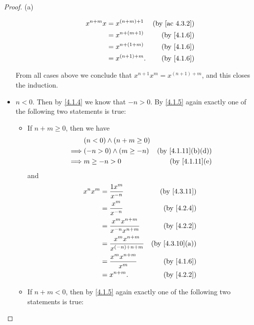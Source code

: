 \begin{proof}{(a)}
\begin{itemize}
\begin{itemize}
\begin{align*}
                    x^{n + m} x & = x^{(n + m) + 1}  & \text{(by \cref{ac 4.3.2})} \\
                                & = x^{n + (m + 1)}  & \text{(by \cref{4.1.6})}    \\
                                & = x^{n + (1 + m)}  & \text{(by \cref{4.1.6})}    \\
                                & = x^{(n + 1) + m}. & \text{(by \cref{4.1.6})}
                  \end{align*}
          \end{itemize}
          From all cases above we conclude that \(x^{n + 1} x^m = x^{(n + 1) + m}\), and this closes the induction.
    \item \(n < 0\).
          Then by \cref{4.1.4} we know that \(-n > 0\).
          By \cref{4.1.5} again exactly one of the following two statements is true:
          \begin{itemize}
            \item If \(n + m \geq 0\), then we have
                  \begin{align*}
                             & (n < 0) \land (n + m \geq 0)                                   \\
                    \implies & (-n > 0) \land (m \geq -n)   & \text{(by \cref{4.1.11}(b)(d))} \\
                    \implies & m \geq -n > 0                & \text{(by \cref{4.1.11}(e)}
                  \end{align*}
                  and
                  \begin{align*}
                    x^n x^m & = \frac{1x^m}{x^{-n}}                    & \text{(by \cref{4.3.11})}    \\
                            & = \frac{x^m}{x^{-n}}                     & \text{(by \cref{4.2.4})}     \\
                            & = \frac{x^m x^{n + m}}{x^{-n} x^{n + m}} & \text{(by \cref{4.2.2})}     \\
                            & = \frac{x^m x^{n + m}}{x^{(-n) + n + m}} & \text{(by \cref{4.3.10}(a))} \\
                            & = \frac{x^m x^{n + m}}{x^m}              & \text{(by \cref{4.1.6})}     \\
                            & = x^{n + m}.                             & \text{(by \cref{4.2.2})}
                  \end{align*}
            \item If \(n + m < 0\), then by \cref{4.1.5} again exactly one of the following two statements is true:

\end{itemize}
\end{itemize}
\end{proof}
